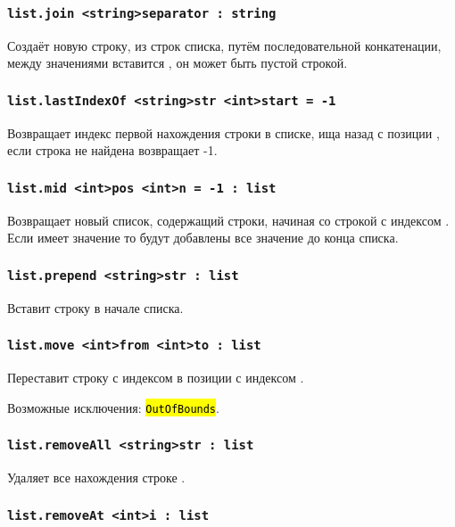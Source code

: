 \documentclass[a4paper, 14pt]{extarticle}
\newcommand{\ferror}[1]{\foreignlanguage{english}{\fontsize{11pt}{12pt}\tt{\sethlcolor{yellow}\hl{#1}}}}
\begin{document}
\subsubsection{\lstinline|list.join <string>separator : string|}

Создаёт новую строку, из строк списка, путём последовательной конкатенации, между значениями вставится , он может быть пустой строкой.

\subsubsection{\lstinline|list.lastIndexOf <string>str <int>start = -1|}

Возвращает индекс первой нахождения строки  в списке, ища назад с позиции , если строка не найдена возвращает -1.

\subsubsection{\lstinline|list.mid <int>pos <int>n = -1 : list|}

Возвращает новый список, содержащий  строки, начиная со строкой с индексом . Если  имеет значение  то будут добавлены все значение до конца списка.

\subsubsection{\lstinline|list.prepend <string>str : list|}

Вставит строку  в начале списка.

\subsubsection{\lstinline|list.move <int>from <int>to : list|}

Переставит строку с индексом  в позиции с индексом .

Возможные исключения: \ferror{OutOfBounds}.

\subsubsection{\lstinline|list.removeAll <string>str : list|}

Удаляет все нахождения строке .

\subsubsection{\lstinline|list.removeAt <int>i : list|}
\end{document}
